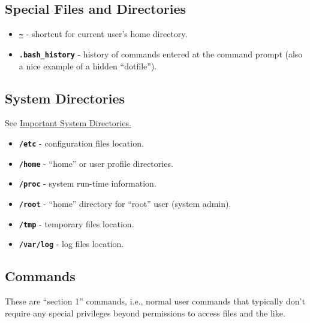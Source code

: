 \documentclass[10pt,]{book}
\numberwithin{figure}{chapter}
\begin{document}
\subsection{Special Files and
Directories}\label{special-files-and-directories}

\begin{itemize}
\itemsep1pt\parskip0pt
\item
  \href{http://linux.die.net/Bash-Beginners-Guide/sect_03_04.html}{\textbf{\texttt{\textasciitilde{}}}}
  - shortcut for current user's home directory.
\item
  \textbf{\texttt{.bash\_history}} - history of commands entered at the
  command prompt (also a nice example of a hidden ``dotfile'').
\end{itemize}

\subsection{System Directories}\label{system-directories}

See \href{http://linux.die.net/abs-guide/systemdirs.html}{Important
System Directories.}

\begin{itemize}
\itemsep1pt\parskip0pt
\item
  \textbf{\texttt{/etc}} - configuration files location.
\item
  \textbf{\texttt{/home}} - ``home'' or user profile directories.
\item
  \textbf{\texttt{/proc}} - system run-time information.
\item
  \textbf{\texttt{/root}} - ``home'' directory for ``root'' user (system
  admin).
\item
  \textbf{\texttt{/tmp}} - temporary files location.
\item
  \textbf{\texttt{/var/log}} - log files location.
\end{itemize}

\subsection{Commands}\label{commands}

These are ``section 1'' commands, i.e., normal user commands that
typically don't require any special privileges beyond permissions to
access files and the like.
\end{document}
